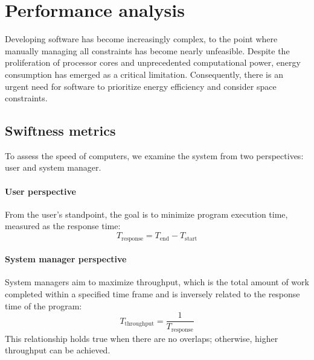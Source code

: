 \section{Performance analysis}

Developing software has become increasingly complex, to the point where manually managing all constraints has become nearly unfeasible. 
Despite the proliferation of processor cores and unprecedented computational power, energy consumption has emerged as a critical limitation. 
Consequently, there is an urgent need for software to prioritize energy efficiency and consider space constraints.

\subsection{Swiftness metrics}
To assess the speed of computers, we examine the system from two perspectives: user and system manager.
\paragraph*{User perspective}
From the user's standpoint, the goal is to minimize program execution time, measured as the response time:
\[T_{\text{response}} = T_{\text{end}} - T_{\text{start}}\]
\paragraph*{System manager perspective}
System managers aim to maximize throughput, which is the total amount of work completed within a specified time frame and is inversely related to the response time of the program:
\[T_{\text{throughput}}=\dfrac{1}{T_{\text{response}}}\]
This relationship holds true when there are no overlaps; otherwise, higher throughput can be achieved.
